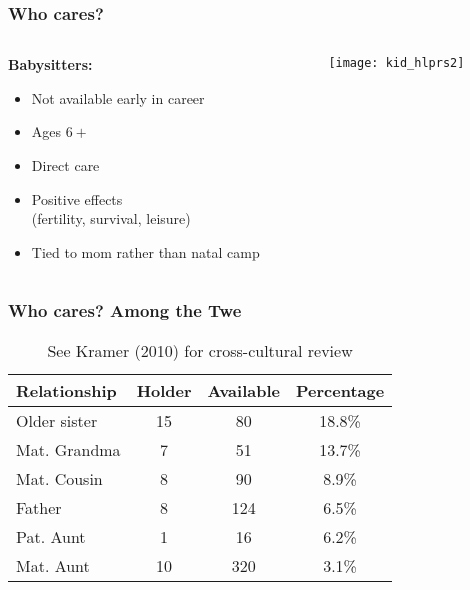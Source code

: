 \documentclass{beamer}
\begin{document}

\begin{frame}
\frametitle{Who cares?}

\begin{columns}
\begin{column}{.5\textwidth}
\textbf{Babysitters:}
\begin{itemize}
\item Not available early in career
\item Ages $6 +$
\item Direct care
\item Positive effects \\
(fertility, survival, leisure)
\item Tied to mom rather than natal camp
\end{itemize}
\end{column}

\begin{column}{.5\textwidth}
\begin{figure}
\texttt{[image: kid\_hlprs2]}
\end{figure}
\end{column}
\end{columns}

\end{frame}


\begin{frame}
\frametitle{Who cares? Among the Twe}
\begin{table}
\begin{tabular}{l c c c}
\toprule
\textbf{Relationship} & \textbf{Holder} & \textbf{Available} & \textbf{Percentage}\\ 
\midrule
Older sister & 15 & 80 & 18.8\%\\
Mat. Grandma & 7 & 51 & 13.7\%\\
Mat. Cousin & 8 & 90 & 8.9\%\\
Father & 8 & 124 & 6.5\%\\
Pat. Aunt & 1 & 16 & 6.2\%\\
Mat. Aunt & 10 & 320 & 3.1\%\\
\bottomrule
\end{tabular}
\caption{See Kramer (2010) for cross-cultural review}
\end{table}
\end{frame}
\end{document}
